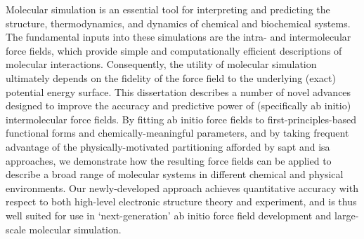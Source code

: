 

Molecular simulation is an essential tool for interpreting and predicting the
structure, thermodynamics, and dynamics of chemical and biochemical systems.
The fundamental inputs into these simulations are the intra- and
intermolecular force fields, which provide simple and computationally
efficient descriptions of molecular interactions.  Consequently, the utility
of molecular simulation ultimately depends on the fidelity of the force field
to the underlying (exact) potential energy surface.  This dissertation
describes a number of novel advances designed to improve the accuracy and
predictive power of (specifically ab initio) intermolecular force fields.  By
fitting ab initio force fields to first-principles-based functional forms and
chemically-meaningful parameters, and by taking frequent advantage of the
physically-motivated partitioning afforded by \acrfull{sapt} and \acrfull{isa} approaches, we
demonstrate how the resulting force fields can be applied to describe a broad
range of molecular systems in different chemical and physical
environments. 
Our newly-developed \mastiff approach
achieves quantitative accuracy with
respect to both high-level electronic structure theory and experiment, and is
thus well suited for use in `next-generation' ab initio force field development
and large-scale molecular simulation.




